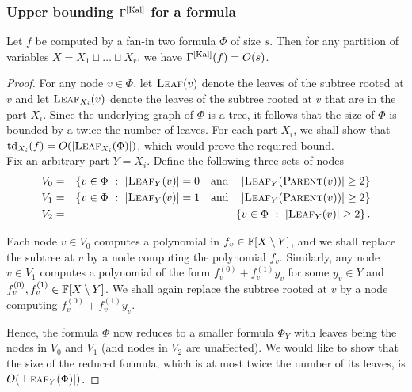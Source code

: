 \subsubsection{Upper bounding $\Gamma^{\mathrm{[Kal]}}$ for a formula}

\begin{lemma}\label{lem:kal-upperbound}
  Let $f$ be computed by a fan-in two formula $\Phi$ of size $s$. Then
  for any partition of variables $X = X_1\sqcup \dots \sqcup X_r$, we
  have $\Gamma^{\mathrm{[Kal]}}(f) = O(s)$.
\end{lemma}
\begin{proof}
  For any node $v\in \Phi$, let $\textsc{Leaf}(v)$ denote the leaves
  of the subtree rooted at $v$ and let $\textsc{Leaf}_{X_i}(v)$ denote
  the leaves of the subtree rooted at $v$ that are in the part
  $X_i$. Since the underlying graph of $\Phi$ is a tree, it follows
  that the size of $\Phi$ is bounded by a twice the number of
  leaves. For each part $X_i$, we shall show that
  $\mathrm{td}_{X_i}(f) = O(\left|\textsc{Leaf}_{X_i}(\Phi)\right|)$, which
  would prove the required bound. \\

  Fix an arbitrary part $Y = X_i$. Define the following three 
  sets of nodes
  \begin{eqnarray*}
    V_0 & = & \left\{{v\in \Phi}\ : \ {\left|\textsc{Leaf}_{Y}(v)\right| = 0 \quad\text{and}\quad \left|\textsc{Leaf}_{Y}(\textsc{Parent}(v))\right| \geq 2}\right\}\\
    V_1 & = & \left\{{v\in \Phi}\ : \ {\left|\textsc{Leaf}_{Y}(v)\right| = 1 \quad\text{and}\quad \left|\textsc{Leaf}_{Y}(\textsc{Parent}(v))\right| \geq 2}\right\}\\
    V_2 & = & \left\{{v\in \Phi}\ : \ {\left|\textsc{Leaf}_{Y}(v)\right| \geq 2}\right\}.
  \end{eqnarray*}

  Each node $v\in V_0$ computes a polynomial in $f_v \in
  \mathbb{F}[X\setminus Y]$, and we shall replace the subtree at $v$ by a node
  computing the polynomial $f_v$. Similarly, any node $v\in V_1$
  computes a polynomial of the form $f^{(0)}_v + f^{(1)}_v y_v$ for some $y_v\in Y$
  and $f^{(0)}_v, f^{(1)}_v \in \mathbb{F}[X\setminus Y]$. We shall again replace the
  subtree rooted at $v$ by a node computing $f^{(0)}_v + f^{(1)}_v y_v$. 

  Hence, the formula $\Phi$ now reduces to a smaller formula $\Phi_Y$ with
  leaves  being the nodes in $V_0$ and $V_1$ (and nodes in $V_2$ are
  unaffected). We would like to show that the size of the reduced
  formula, which is at most twice the number of its leaves, is
  $O(\left|\textsc{Leaf}_Y(\Phi)\right|)$.


\end{proof}
